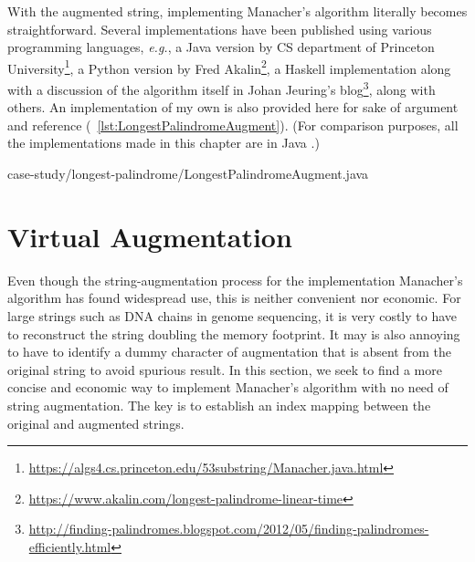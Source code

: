 \documentclass[oneside,11pt]{book}
\theoremstyle{definition}
\theoremstyle{remark}
\newcommand{\java}{Java }
\newcommand{\python}{Python }
\begin{document}
With the augmented string, implementing Manacher's algorithm literally becomes straightforward.
Several implementations have been published using various programming languages, \textit{e.g.},
a \java version by CS department of Princeton
University\footnote{\url{https://algs4.cs.princeton.edu/53substring/Manacher.java.html}},
a \python version by Fred Akalin\footnote{\url{https://www.akalin.com/longest-palindrome-linear-time}},
a Haskell implementation along with a discussion of the algorithm itself
in Johan Jeuring's blog\footnote{
\url{http://finding-palindromes.blogspot.com/2012/05/finding-palindromes-efficiently.html}},
along with others.
An implementation of my own is also provided here for sake of argument and reference
(~\autoref{lst:LongestPalindromeAugment}).
(For comparison purposes, all the implementations made in this chapter are in \java.)

\newpage
\begin{clisting}[H]
    
    {case-study/longest-palindrome/LongestPalindromeAugment.java}
\end{clisting}


\section{Virtual Augmentation}\label{sec:virtualMapping}

Even though the string-augmentation process for the implementation Manacher's algorithm has found
widespread use, this is neither convenient nor economic.
For large strings such as DNA chains in genome sequencing, it is very costly to have to
reconstruct the string doubling the memory footprint.
It may is also annoying to have to identify a dummy character of augmentation
that is absent from the original string to avoid spurious result.
In this section, we seek to find a more concise and economic way to
implement Manacher's algorithm with no need of string augmentation.
The key is to establish an index mapping between the original and augmented strings.
\end{document}
